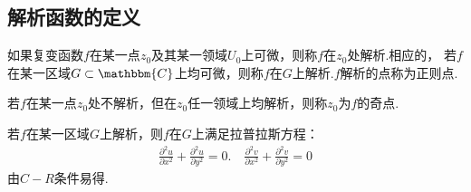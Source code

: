     \subsection{解析函数的定义}
        \begin{definition}[解析函数]\label{def:analytic_function}
            如果复变函数$f$在某一点$z_0$及其某一领域$U_0$上可微，则称$f$在$z_0$处解析.相应的，
            若$f$在某一区域$G \subset \mathbbm{C}$上均可微，则称$f$在$G$上解析.$f$解析的点称为正则点.
        \end{definition}
        \begin{definition}[奇点]\label{def:singular_point}
            若$f$在某一点$z_0$处不解析，但在$z_0$任一领域上均解析，则称$z_0$为$f$的奇点.
        \end{definition}
        \begin{theorem}[Laplace 方程]\label{the:Laplace_equation}
            若$f$在某一区域$G$上解析，则$f$在$G$上满足拉普拉斯方程：
            \begin{align*}
                \frac{\partial^2 u}{\partial x^2} + \frac{\partial^2 u}{\partial y^2} = 0. \quad \frac{\partial^2 v}{\partial x^2} + \frac{\partial^2 v}{\partial y^2} = 0
            \end{align*}
            由$C-R$条件易得.
        \end{theorem}

